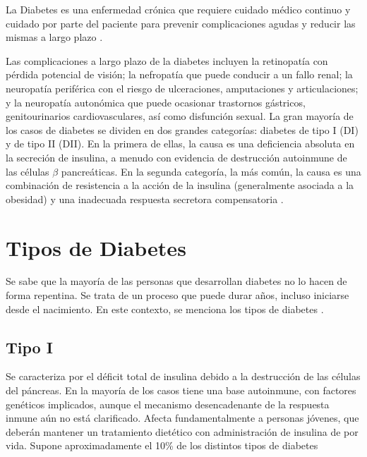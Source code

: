 La Diabetes es una enfermedad crónica que requiere cuidado médico continuo y cuidado por parte del paciente para prevenir complicaciones agudas y reducir las mismas a largo plazo \cite{wagner2001improving}.

Las complicaciones a largo plazo de la diabetes incluyen la retinopatía con pérdida potencial de visión; la nefropatía que puede conducir a un fallo renal; la neuropatía periférica con el riesgo de ulceraciones, amputaciones y articulaciones; y la neuropatía autonómica que puede ocasionar trastornos gástricos, genitourinarios cardiovasculares, así como disfunción sexual.
La gran mayoría de los casos de diabetes se dividen en dos grandes categorías: diabetes de tipo I (DI) y de tipo II (DII). En la primera de ellas, la causa es una deficiencia absoluta en la secreción de insulina, a menudo con evidencia de destrucción
autoinmune de las células $\beta$ pancreáticas. 
%
En la segunda categoría, la más común, la causa es una combinación de resistencia a la acción de la insulina (generalmente asociada a la obesidad) y una inadecuada respuesta secretora compensatoria \cite{alfaro2000tratamiento}.
\section{Tipos de Diabetes}
Se sabe que la mayoría de las personas que desarrollan diabetes no lo hacen de forma repentina. Se trata de un proceso que puede durar años, incluso iniciarse desde el nacimiento. En este contexto, se menciona  los tipos de diabetes \cite{ceocomplicaciones}.
\subsection{Tipo I}
Se caracteriza por el déficit total de insulina debido a la destrucción de las células del páncreas. En
la mayoría de los casos tiene una base autoinmune, con factores genéticos implicados, aunque el mecanismo desencadenante de la respuesta inmune aún no está clarificado. Afecta fundamentalmente a personas jóvenes, que deberán mantener un tratamiento dietético con administración de insulina de por vida. Supone aproximadamente el 10\% de los distintos
tipos de diabetes \cite{mellitus2004diabetes}

